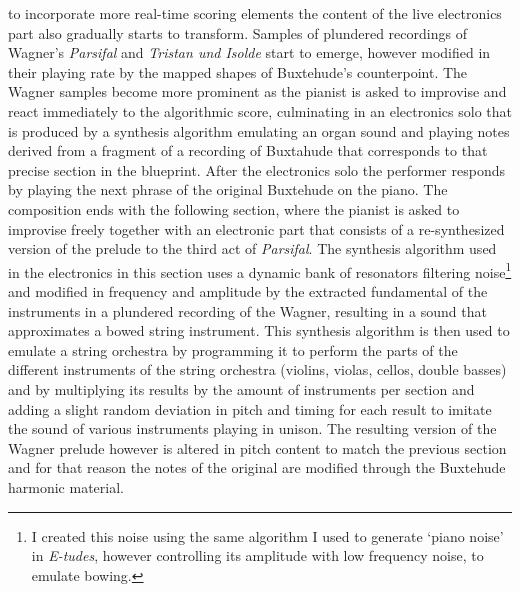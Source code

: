 to incorporate more real-time scoring elements the content of the live electronics part also gradually starts to transform. Samples of plundered recordings of Wagner's \emph{Parsifal} and \emph{Tristan und Isolde} start to emerge, however modified in their playing rate by the mapped shapes of Buxtehude's counterpoint. The Wagner samples become more prominent as the pianist is asked to improvise and react immediately to the algorithmic score, culminating in an electronics solo that is produced by a synthesis algorithm emulating an organ sound and playing notes derived from a fragment of a recording of Buxtahude that corresponds to that precise section in the blueprint. After the electronics solo the performer responds by playing the next phrase of the original Buxtehude on the piano. The composition ends with the following section, where the pianist is asked to improvise freely together with an electronic part that consists of a re-synthesized version of the prelude to the third act of \emph{Parsifal}. The synthesis algorithm used in the electronics in this section uses a dynamic bank of resonators filtering noise\footnote{I created this noise using the same algorithm I used to generate `piano noise' in \emph{E-tudes}, however controlling its amplitude with low frequency noise, to emulate bowing.} and modified in frequency and amplitude by the extracted fundamental of the instruments in a plundered recording of the Wagner, resulting in a sound that approximates a bowed string instrument. This synthesis algorithm is then used to emulate a string orchestra by programming it to perform the parts of the different instruments of the string orchestra (violins, violas, cellos, double basses) and by multiplying its results by the amount of instruments per section and adding a slight random deviation in pitch and timing for each result to imitate the sound of various instruments playing in unison. The resulting version of the Wagner prelude however is altered in pitch content to match the previous section and for that reason the notes of the original are modified through the Buxtehude harmonic material.
 
